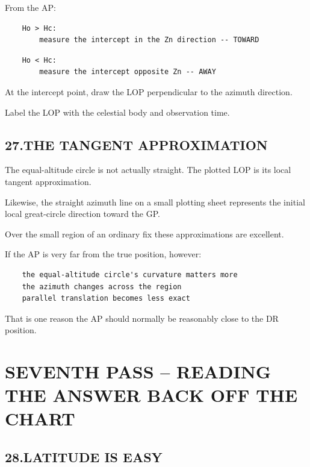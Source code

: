 \documentclass[11pt]{article}
\begin{document}
From the AP:

\begin{verbatim}
    Ho > Hc:
        measure the intercept in the Zn direction -- TOWARD
\end{verbatim}

\begin{verbatim}
    Ho < Hc:
        measure the intercept opposite Zn -- AWAY
\end{verbatim}

At the intercept point, draw the LOP perpendicular to the azimuth direction.

Label the LOP with the celestial body and observation time.

\subsection*{27.\quad THE TANGENT APPROXIMATION}

The equal-altitude circle is not actually straight. The plotted LOP is its local tangent approximation.

Likewise, the straight azimuth line on a small plotting sheet represents the initial local great-circle direction toward the GP.

Over the small region of an ordinary fix these approximations are excellent.

If the AP is very far from the true position, however:

\begin{verbatim}
    the equal-altitude circle's curvature matters more
    the azimuth changes across the region
    parallel translation becomes less exact
\end{verbatim}

That is one reason the AP should normally be reasonably close to the DR position.

\section*{SEVENTH PASS -- READING THE ANSWER BACK OFF THE CHART}

\subsection*{28.\quad LATITUDE IS EASY}
\end{document}
